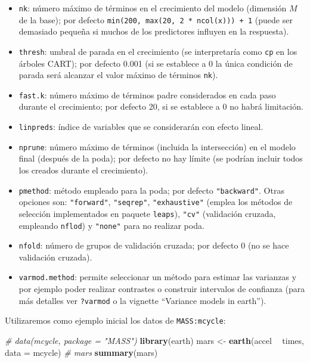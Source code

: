\documentclass[
]{book}
\newenvironment{Shaded}{\begin{snugshade}}{\end{snugshade}}
\newcommand{\CommentTok}[1]{\textcolor[rgb]{0.56,0.35,0.01}{\textit{#1}}}
\newcommand{\DataTypeTok}[1]{\textcolor[rgb]{0.13,0.29,0.53}{#1}}
\newcommand{\KeywordTok}[1]{\textcolor[rgb]{0.13,0.29,0.53}{\textbf{#1}}}
\newcommand{\NormalTok}[1]{#1}
\newcommand{\OperatorTok}[1]{\textcolor[rgb]{0.81,0.36,0.00}{\textbf{#1}}}
\newcommand{\StringTok}[1]{\textcolor[rgb]{0.31,0.60,0.02}{#1}}
\theoremstyle{break}
\theoremstyle{definition}
\theoremstyle{definition}
\theoremstyle{definition}
\theoremstyle{remark}
\begin{document}
\begin{itemize}
\item
  \texttt{nk}: número máximo de términos en el crecimiento del modelo (dimensión \(M\) de la base); por defecto \texttt{min(200,\ max(20,\ 2\ *\ ncol(x)))\ +\ 1} (puede ser demasiado pequeña si muchos de los predictores influyen en la respuesta).
\item
  \texttt{thresh}: umbral de parada en el crecimiento (se interpretaría como \texttt{cp} en los árboles CART); por defecto 0.001 (si se establece a 0 la única condición de parada será alcanzar el valor máximo de términos \texttt{nk}).
\item
  \texttt{fast.k}: número máximo de términos padre considerados en cada paso durante el crecimiento; por defecto 20, si se establece a 0 no habrá limitación.
\item
  \texttt{linpreds}: índice de variables que se considerarán con efecto lineal.
\item
  \texttt{nprune}: número máximo de términos (incluida la intersección) en el modelo final (después de la poda); por defecto no hay límite (se podrían incluir todos los creados durante el crecimiento).
\item
  \texttt{pmethod}: método empleado para la poda; por defecto \texttt{"backward"}. Otras opciones son: \texttt{"forward"}, \texttt{"seqrep"}, \texttt{"exhaustive"} (emplea los métodos de selección implementados en paquete \texttt{leaps}), \texttt{"cv"} (validación cruzada, empleando \texttt{nflod}) y \texttt{"none"} para no realizar poda.
\item
  \texttt{nfold}: número de grupos de validación cruzada; por defecto 0 (no se hace validación cruzada).
\item
  \texttt{varmod.method}: permite seleccionar un método para estimar las varianzas y por ejemplo poder realizar contrastes o construir intervalos de confianza (para más detalles ver \texttt{?varmod} o la vignette ``Variance models in earth'').
\end{itemize}

Utilizaremos como ejemplo inicial los datos de \texttt{MASS:mcycle}:

\begin{Shaded}
\begin{Highlighting}[]
\CommentTok{# data(mcycle, package = "MASS")}
\KeywordTok{library}\NormalTok{(earth)}
\NormalTok{mars <-}\StringTok{ }\KeywordTok{earth}\NormalTok{(accel }\OperatorTok{~}\StringTok{ }\NormalTok{times, }\DataTypeTok{data =}\NormalTok{ mcycle)}
\CommentTok{# mars}
\KeywordTok{summary}\NormalTok{(mars)}
\end{Highlighting}
\end{Shaded}
\end{document}
